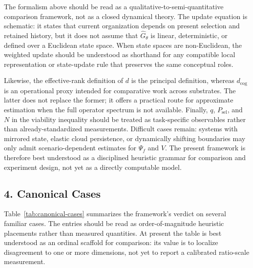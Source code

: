 \documentclass[Afour,sageh,times,doublespace]{sagej}
\begin{document}
The formalism above should be read as a qualitative-to-semi-quantitative comparison framework, not as a closed dynamical theory. The update equation is schematic: it states that current organization depends on present selection and retained history, but it does not assume that \(\hat{G}_\theta\) is linear, deterministic, or defined over a Euclidean state space. When state spaces are non-Euclidean, the weighted update should be understood as shorthand for any compatible local representation or state-update rule that preserves the same conceptual roles.

Likewise, the effective-rank definition of \(d\) is the principal definition, whereas \(d_{\mathrm{cog}}\) is an operational proxy intended for comparative work across substrates. The latter does not replace the former; it offers a practical route for approximate estimation when the full operator spectrum is not available. Finally, \(q\), \(P_{\mathrm{sel}}\), and \(N\) in the viability inequality should be treated as task-specific observables rather than already-standardized measurements. Difficult cases remain: systems with mirrored state, elastic cloud persistence, or dynamically shifting boundaries may only admit scenario-dependent estimates for \(\Psi_f\) and \(V\). The present framework is therefore best understood as a disciplined heuristic grammar for comparison and experiment design, not yet as a directly computable model.

\subsection{4. Canonical Cases}\label{canonical-cases}

Table~\ref{tab:canonical-cases} summarizes the framework's verdict on several familiar cases. The entries should be read as order-of-magnitude heuristic placements rather than measured quantities. At present the table is best understood as an ordinal scaffold for comparison: its value is to localize disagreement to one or more dimensions, not yet to report a calibrated ratio-scale measurement.
\end{document}
